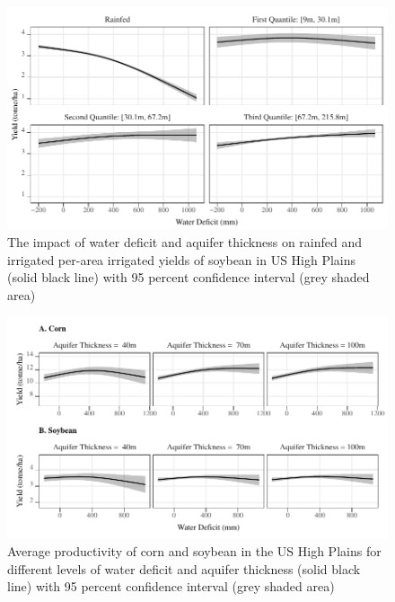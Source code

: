\documentclass[
]{article}
\begin{document}
\begin{figure}[H]

{\centering \includegraphics[width=6in,]{Figures/g_yield_with_conf_soy} 

}

\caption{The impact of water deficit and aquifer thickness on rainfed and irrigated per-area irrigated yields of soybean in US High Plains (solid black line) with 95 percent confidence interval (grey shaded area)}\label{fig:irrigated-yield-ind-soy}
\end{figure}

\begin{figure}[H]

{\centering \includegraphics[width=6.5in,]{Figures/g_avg_yield} 

}

\caption{Average productivity of corn and soybean in the US High Plains for different levels of water deficit and aquifer thickness (solid black line) with 95 percent confidence interval (grey shaded area)}\label{fig:avg-yield-ind}
\end{figure}
\end{document}

